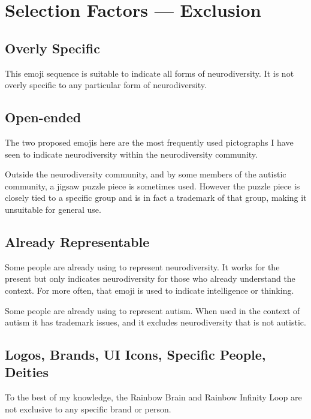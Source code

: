 \section{Selection Factors --- Exclusion}

\setcounter{subsection}{5}

\subsection{Overly Specific}

This emoji sequence is suitable to indicate all forms of neurodiversity. It is not
overly specific to any particular form of neurodiversity.

\subsection{Open-ended}

The two proposed emojis here are the most frequently used pictographs I have seen to indicate
neurodiversity within the neurodiversity community.

Outside the neurodiversity community, and by some members of the autistic community, a jigsaw
puzzle piece is sometimes used. However the puzzle piece is closely tied to a specific group
and is in fact a trademark of that group, making it unsuitable for general use.

\subsection{Already Representable}

Some people are already using \brainemoji{} to represent neurodiversity.
It works for the present but only indicates neurodiversity for those
who already understand the context. For more often, that emoji is used to indicate intelligence
or thinking.

Some people are already using \jigsawemoji{} to represent autism.
When used in the context of autism it has trademark issues, and it
excludes neurodiversity that is not autistic.

\subsection{Logos, Brands, UI Icons, Specific People, Deities}

To the best of my knowledge, the Rainbow Brain and Rainbow Infinity Loop are not exclusive to
any specific brand or person.

